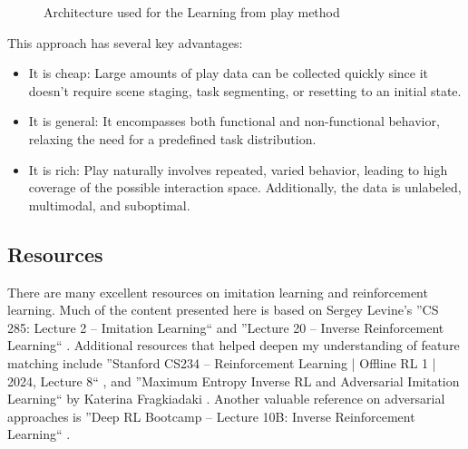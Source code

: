 \begin{figure}[H]
    \centering
    
    \caption{Architecture used for the Learning from play method}
    \label{fig:LearningFromPlay}
\end{figure}


This approach has several key advantages:
\begin{itemize}
\item It is cheap: Large amounts of play data can be collected quickly since it doesn't require scene staging, task segmenting, or resetting to an initial state.
\item It is general: It encompasses both functional and non-functional behavior, relaxing the need for a predefined task distribution.
\item It is rich: Play naturally involves repeated, varied behavior, leading to high coverage of the possible interaction space. Additionally, the data is unlabeled, multimodal, and suboptimal.
\end{itemize}

\subsection{Resources}
There are many excellent resources on imitation learning and reinforcement learning. Much 
of the content presented here is based on Sergey Levine’s ''CS 285: Lecture 2 – Imitation 
Learning`` and ''Lecture 20 – Inverse Reinforcement Learning`` 
\cite{CS285,CS285LevineYoutube}. Additional resources that helped deepen my understanding 
of feature matching include ''Stanford CS234 – Reinforcement Learning | Offline RL 1 | 
2024, Lecture 8`` \cite{CS234Stanford}, and ''Maximum Entropy Inverse RL and Adversarial 
Imitation Learning`` by Katerina Fragkiadaki \cite{DeepRLandControl}. Another valuable 
reference on adversarial approaches is ''Deep RL Bootcamp – Lecture 10B: Inverse 
Reinforcement Learning`` \cite{DeepRlBootcamp}.


